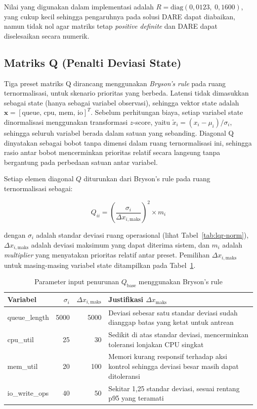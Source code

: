 Nilai yang digunakan dalam implementasi adalah $R = \text{diag}(0{,}0123,\; 0{,}1600)$,
yang cukup kecil sehingga pengaruhnya pada solusi DARE dapat diabaikan, namun tidak nol
agar matriks tetap \emph{positive definite} dan DARE dapat diselesaikan secara numerik.

\subsection{Matriks Q (Penalti Deviasi State)}

Tiga preset matriks Q dirancang menggunakan \emph{Bryson's rule} pada ruang ternormalisasi,
untuk skenario prioritas yang berbeda.
Latensi tidak dimasukkan sebagai state (hanya sebagai variabel observasi), sehingga vektor state
adalah $\mathbf{x} = [\text{queue, cpu, mem, io}]^T$.
Sebelum perhitungan biaya, setiap variabel state dinormalisasi menggunakan transformasi
$z$-score, yaitu $\tilde{x}_i = (x_i - \mu_i) / \sigma_i$, sehingga seluruh variabel
berada dalam satuan yang sebanding.
Diagonal Q dinyatakan sebagai bobot tanpa dimensi dalam ruang ternormalisasi ini,
sehingga rasio antar bobot mencerminkan prioritas relatif secara langsung tanpa bergantung
pada perbedaan satuan antar variabel.

Setiap elemen diagonal $Q$ diturunkan dari Bryson's rule pada ruang ternormalisasi sebagai:

\begin{equation}
Q_{ii} = \left( \frac{\sigma_i}{\Delta x_{i,\text{maks}}} \right)^2 \times m_i
\label{eq:q-bryson}
\end{equation}

dengan $\sigma_i$ adalah standar deviasi ruang operasional (lihat Tabel~\ref{tab:lqr-norm}),
$\Delta x_{i,\text{maks}}$ adalah deviasi maksimum yang dapat diterima sistem, dan $m_i$ adalah
\emph{multiplier} yang menyatakan prioritas relatif antar preset.
Pemilihan $\Delta x_{i,\text{maks}}$ untuk masing-masing variabel state ditampilkan pada
Tabel~\ref{tab:q-input}.

\begin{table}[H]
    \centering
    \caption{Parameter input penurunan $Q_\text{base}$ menggunakan Bryson's rule}
    \label{tab:q-input}
    \renewcommand{\arraystretch}{1.4}
    \begin{tabular}{|l|r|r|p{6cm}|}
    \hline
    \textbf{Variabel} & \textbf{$\sigma_i$} & \textbf{$\Delta x_{i,\text{maks}}$} & \textbf{Justifikasi $\Delta x_\text{maks}$} \\
    \hline
    queue\_length & 5000 & 5000 & Deviasi sebesar satu standar deviasi sudah dianggap batas yang ketat untuk antrean \\
    \hline
    cpu\_util & 25 & 30 & Sedikit di atas standar deviasi, mencerminkan toleransi lonjakan CPU singkat \\
    \hline
    mem\_util & 20 & 100 & Memori kurang responsif terhadap aksi kontrol sehingga deviasi besar masih dapat ditoleransi \\
    \hline
    io\_write\_ops & 40 & 50 & Sekitar 1{,}25 standar deviasi, sesuai rentang p95 yang teramati \\
    \hline
    \end{tabular}
\end{table}

